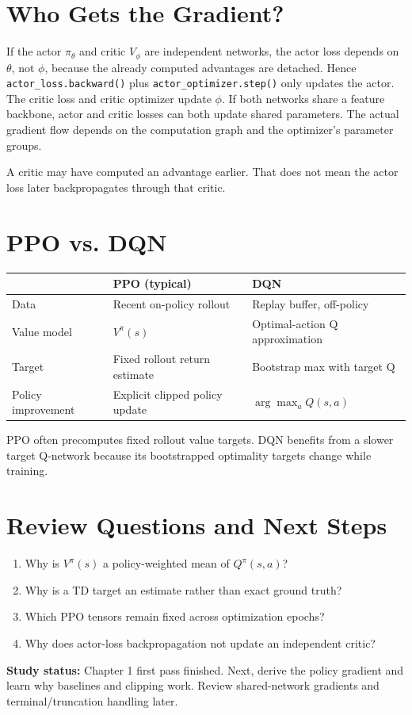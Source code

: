 \section{Who Gets the Gradient?}
If the actor $\pi_\theta$ and critic $V_\phi$ are independent networks, the actor loss depends on $\theta$, not $\phi$, because the already computed advantages are detached. Hence \texttt{actor\_loss.backward()} plus \texttt{actor\_optimizer.step()} only updates the actor. The critic loss and critic optimizer update $\phi$.
If both networks share a feature backbone, actor and critic losses can both update shared parameters. The actual gradient flow depends on the computation graph and the optimizer's parameter groups.
\begin{pitfall}
A critic may have computed an advantage earlier. That does not mean the actor loss later backpropagates through that critic.
\end{pitfall}
\section{PPO vs. DQN}
\begin{center}\small
\begin{tabularx}{\textwidth}{@{}lXX@{}}\toprule
& PPO (typical) & DQN\\\midrule
Data & Recent on-policy rollout & Replay buffer, off-policy\\
Value model & $V^\pi(s)$ & Optimal-action Q approximation\\
Target & Fixed rollout return estimate & Bootstrap max with target Q\\
Policy improvement & Explicit clipped policy update & $\arg\max_a Q(s,a)$\\
\bottomrule\end{tabularx}
\end{center}
PPO often precomputes fixed rollout value targets. DQN benefits from a slower target Q-network because its bootstrapped optimality targets change while training.
\section{Review Questions and Next Steps}
\begin{enumerate}
\item Why is $V^\pi(s)$ a policy-weighted mean of $Q^\pi(s,a)$?
\item Why is a TD target an estimate rather than exact ground truth?
\item Which PPO tensors remain fixed across optimization epochs?
\item Why does actor-loss backpropagation not update an independent critic?
\end{enumerate}
\textbf{Study status:} Chapter 1 first pass finished. Next, derive the policy gradient and learn why baselines and clipping work. Review shared-network gradients and terminal/truncation handling later.
